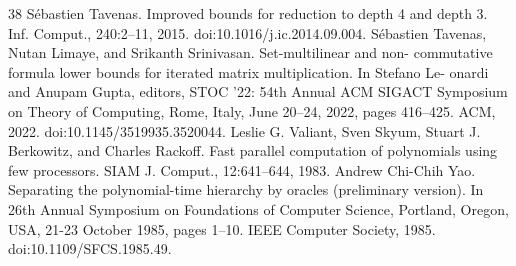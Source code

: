 \begin{thebibliography}{38}
 Sébastien Tavenas. Improved bounds for reduction to depth 4 and depth 3. Inf. Comput., 240:2–11, 2015. doi:10.1016/j.ic.2014.09.004.
 Sébastien Tavenas, Nutan Limaye, and Srikanth Srinivasan. Set-multilinear and non- commutative formula lower bounds for iterated matrix multiplication. In Stefano Le- onardi and Anupam Gupta, editors, STOC ’22: 54th Annual ACM SIGACT Symposium on Theory of Computing, Rome, Italy, June 20–24, 2022, pages 416–425. ACM, 2022. doi:10.1145/3519935.3520044.
 Leslie G. Valiant, Sven Skyum, Stuart J. Berkowitz, and Charles Rackoff. Fast parallel computation of polynomials using few processors. SIAM J. Comput., 12:641–644, 1983.
 Andrew Chi-Chih Yao. Separating the polynomial-time hierarchy by oracles (preliminary version). In 26th Annual Symposium on Foundations of Computer Science, Portland, Oregon, USA, 21-23 October 1985, pages 1–10. IEEE Computer Society, 1985. doi:10.1109/SFCS.1985.49.
\end{thebibliography}
